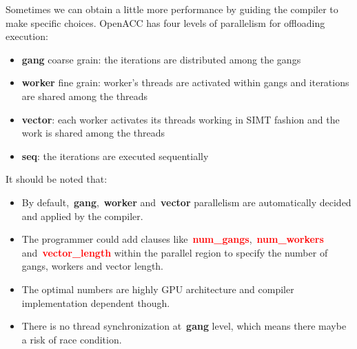 





\par
Sometimes we can obtain a little more performance by guiding the compiler to make specific choices.
OpenACC has four levels of parallelism for offloading execution:
\begin{itemize}
    \item \textbf{gang} coarse grain: the iterations are distributed among the gangs
    \item \textbf{worker} fine grain: worker’s threads are activated within gangs and iterations are shared among the threads
    \item \textbf{vector}: each worker activates its threads working in SIMT fashion and the work is shared among the threads
    \item \textbf{seq}: the iterations are executed sequentially
\end{itemize}


\par
It should be noted that:
\begin{itemize}
    \item By default,~\textbf{gang},~\textbf{worker} and~\textbf{vector} parallelism are automatically decided and applied by the compiler.
    \item The programmer could add clauses like~\textbf{\textcolor{red}{num\_gangs}},~\textbf{\textcolor{red}{num\_workers}} and~\textbf{\textcolor{red}{vector\_length}} within the parallel region to specify the number of gangs, workers and vector length.
    \item The optimal numbers are highly GPU architecture and compiler implementation dependent though.
    \item There is no thread synchronization at~\textbf{gang} level, which means there maybe a risk of race condition.
\end{itemize}


